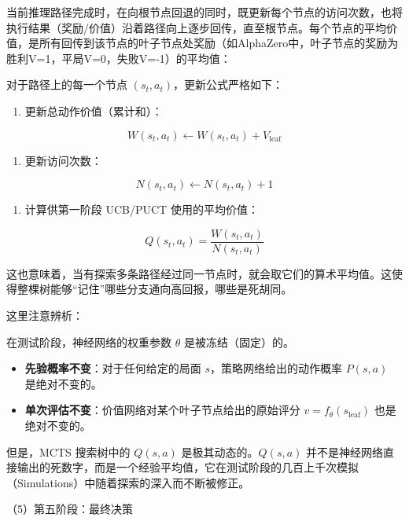 当前推理路径完成时，在向根节点回退的同时，既更新每个节点的访问次数，也将执行结果（奖励/价值）沿着路径向上逐步回传，直至根节点。每个节点的平均价值，是所有回传到该节点的叶子节点处奖励（如AlphaZero中，叶子节点的奖励为胜利V=1，平局V=0，失败V=-1）的平均值：

对于路径上的每一个节点 \((s_t,a_t)\)，更新公式严格如下：

\begin{enumerate}
\def\labelenumi{\arabic{enumi}.}
\tightlist
\item
  更新总动作价值（累计和）：
\end{enumerate}

\[
W(s_t,a_t)\leftarrow W(s_t,a_t)+V_{\mathrm{leaf}}
\]

\begin{enumerate}
\def\labelenumi{\arabic{enumi}.}
\setcounter{enumi}{1}
\tightlist
\item
  更新访问次数：
\end{enumerate}

\[
N(s_t,a_t)\leftarrow N(s_t,a_t)+1
\]

\begin{enumerate}
\def\labelenumi{\arabic{enumi}.}
\setcounter{enumi}{2}
\tightlist
\item
  计算供第一阶段 UCB/PUCT 使用的平均价值：
\end{enumerate}

\[
Q(s_t,a_t)=\frac{W(s_t,a_t)}{N(s_t,a_t)}
\]

这也意味着，当有探索多条路径经过同一节点时，就会取它们的算术平均值。这使得整棵树能够``记住''哪些分支通向高回报，哪些是死胡同。

这里注意辨析：

在测试阶段，神经网络的权重参数 \(\theta\) 是被冻结（固定）的。

\begin{itemize}
\tightlist
\item
  \textbf{先验概率不变}：对于任何给定的局面 \(s\)，策略网络给出的动作概率 \(P(s,a)\) 是绝对不变的。
\item
  \textbf{单次评估不变}：价值网络对某个叶子节点给出的原始评分 \(v=f_\theta(s_{\mathrm{leaf}})\) 也是绝对不变的。
\end{itemize}

但是，MCTS 搜索树中的 \(Q(s,a)\) 是极其动态的。\(Q(s,a)\) 并不是神经网络直接输出的死数字，而是一个经验平均值，它在测试阶段的几百上千次模拟（Simulations）中随着探索的深入而不断被修正。

（5）第五阶段：最终决策

